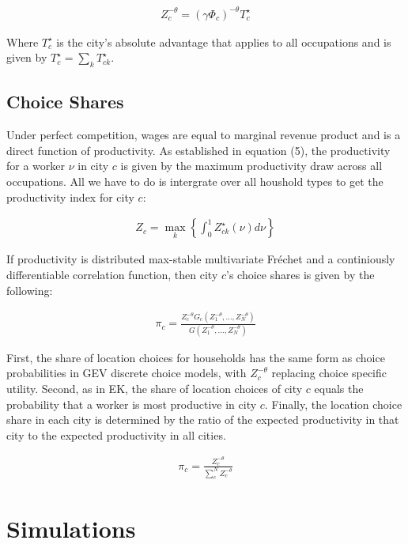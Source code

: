 \documentclass[10pt]{article}
\begin{document}
\begin{align}
    Z_c^{-\theta} = (\gamma \Phi_c)^{-\theta} T_c^{\star}
\end{align}

Where $T_c^{\star}$ is the city's absolute advantage that applies to all occupations and is given by $T_c^{\star} = \sum_{k}^{} T_{ck}^{\star}$.

\subsection{Choice Shares}

Under perfect competition, wages are equal to marginal revenue product and is a direct function of productivity. As established in equation (5), the productivity for a worker $\nu$ in city $c$ is given by the maximum productivity draw across all occupations. All we have to do is intergrate over all houshold types to get the productivity index for city $c$:

\begin{align}
    Z_c = \max_k \left\{ \int_{0}^{1} Z_{ck}^{\star} (\nu) d\nu \right\}
\end{align}

If productivity is distributed max-stable multivariate Fréchet and a continiously differentiable correlation function, then city $c$'s choice shares is given by the following:

\begin{align}
    \pi_c = \frac{Z_c^{-\theta} G_c(Z_1^{-\theta}, \dots, Z_N^{-\theta})}{G(Z_1^{-\theta}, \dots, Z_N^{-\theta})}
\end{align}

First, the share of location choices for households has the same form as choice probabilities in GEV discrete choice models, with $Z_c^{-\theta}$ replacing choice specific utility. Second, as in EK, the share of location choices of city $c$ equals the probability that a worker is most productive in city $c$. Finally, the location choice share in each city is determined by the ratio of the expected productivity in that city to the expected productivity in all cities.

\begin{align}
    \pi_c = \frac{Z_c^{-\theta}}{\sum_{c}^{N} Z_c^{-\theta}}
\end{align}

\section{Simulations}
\end{document}
